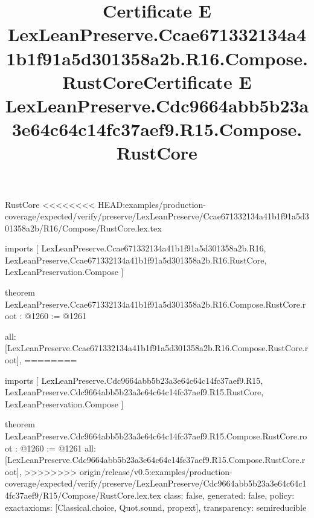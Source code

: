 \begin{lexlean}{RustCore}
<<<<<<<< HEAD:examples/production-coverage/expected/verify/preserve/LexLeanPreserve/Ccae671332134a41b1f91a5d301358a2b/R16/Compose/RustCore.lex.tex
\title{Certificate E LexLeanPreserve.Ccae671332134a41b1f91a5d301358a2b.R16.Compose.RustCore}
\begin{coremodule}
imports [
  LexLeanPreserve.Ccae671332134a41b1f91a5d301358a2b.R16,
  LexLeanPreserve.Ccae671332134a41b1f91a5d301358a2b.R16.RustCore,
  LexLeanPreservation.Compose
]

theorem LexLeanPreserve.Ccae671332134a41b1f91a5d301358a2b.R16.Compose.RustCore.root : @1260 := @1261 {
  all: [LexLeanPreserve.Ccae671332134a41b1f91a5d301358a2b.R16.Compose.RustCore.root],
========
\title{Certificate E LexLeanPreserve.Cdc9664abb5b23a3e64c64c14fc37aef9.R15.Compose.RustCore}
\begin{coremodule}
imports [
  LexLeanPreserve.Cdc9664abb5b23a3e64c64c14fc37aef9.R15,
  LexLeanPreserve.Cdc9664abb5b23a3e64c64c14fc37aef9.R15.RustCore,
  LexLeanPreservation.Compose
]

theorem LexLeanPreserve.Cdc9664abb5b23a3e64c64c14fc37aef9.R15.Compose.RustCore.root : @1260 := @1261 {
  all: [LexLeanPreserve.Cdc9664abb5b23a3e64c64c14fc37aef9.R15.Compose.RustCore.root],
>>>>>>>> origin/release/v0.5:examples/production-coverage/expected/verify/preserve/LexLeanPreserve/Cdc9664abb5b23a3e64c64c14fc37aef9/R15/Compose/RustCore.lex.tex
  class: false,
  generated: false,
  policy: exact{axioms: [Classical.choice, Quot.sound, propext]},
  transparency: semireducible
}


\end{coremodule}}
\end{coremodule}
\end{lexlean}
